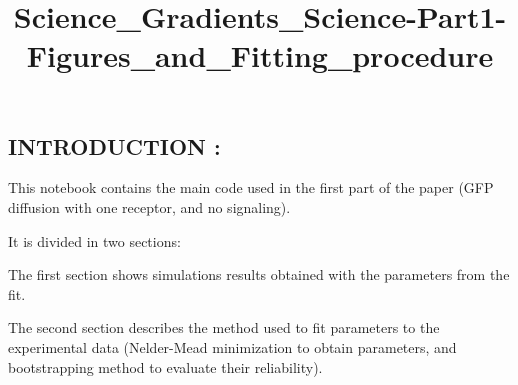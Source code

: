 \documentclass[11pt]{article}
\title{Science\_Gradients\_Science-Part1-Figures\_and\_Fitting\_procedure}
\begin{document}
    
    
    \maketitle
    
    

    
    \subsection{INTRODUCTION :}\label{introduction}

This notebook contains the main code used in the first part of the paper
(GFP diffusion with one receptor, and no signaling).

It is divided in two sections:

The first section shows simulations results obtained with the parameters
from the fit.

The second section describes the method used to fit parameters to the
experimental data (Nelder-Mead minimization to obtain parameters, and
bootstrapping method to evaluate their reliability).
\end{document}
